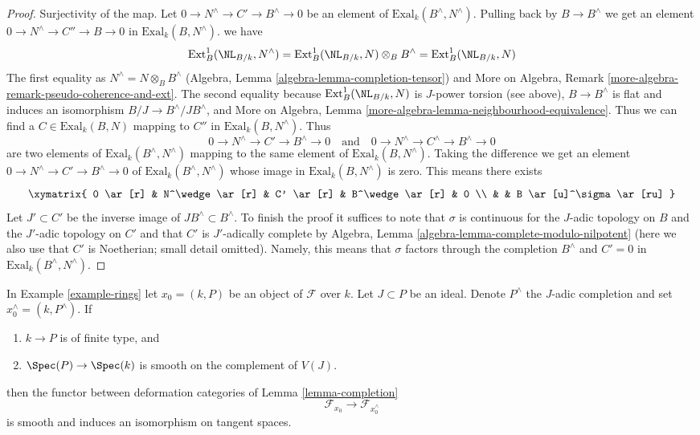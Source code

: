 \begin{proof}
\medskip\noindent
Surjectivity of the map. Let $0 \to N^\wedge \to C' \to B^\wedge \to 0$
be an element of $\text{Exal}_k(B^\wedge, N^\wedge)$.
Pulling back by $B \to B^\wedge$ we get an element
$0 \to N^\wedge \to C'' \to B \to 0$ in
$\text{Exal}_k(B, N^\wedge)$.
we have
$$
\text{Ext}^1_B(\NL_{B/k}, N^\wedge) =
\text{Ext}^1_B(\NL_{B/k}, N) \otimes_B B^\wedge =
\text{Ext}^1_B(\NL_{B/k}, N)
$$
The first equality as $N^\wedge = N \otimes_B B^\wedge$
(Algebra, Lemma \ref{algebra-lemma-completion-tensor})
and
More on Algebra, Remark \ref{more-algebra-remark-pseudo-coherence-and-ext}.
The second equality because $\text{Ext}^1_B(\NL_{B/k}, N)$
is $J$-power torsion (see above), $B \to B^\wedge$ is flat and induces
an isomorphism $B/J \to B^\wedge/JB^\wedge$, and
More on Algebra, Lemma \ref{more-algebra-lemma-neighbourhood-equivalence}.
Thus we can find a $C \in \text{Exal}_k(B, N)$ mapping to $C''$ in
$\text{Exal}_k(B, N^\wedge)$.
Thus
$$
0 \to N^\wedge \to C' \to B^\wedge \to 0
\quad\text{and}\quad
0 \to N^\wedge \to C^\wedge \to B^\wedge \to 0
$$
are two elements of $\text{Exal}_k(B^\wedge, N^\wedge)$
mapping to the same element of $\text{Exal}_k(B, N^\wedge)$.
Taking the difference we get an element
$0 \to N^\wedge \to C' \to B^\wedge \to 0$ of
$\text{Exal}_k(B^\wedge, N^\wedge)$
whose image in $\text{Exal}_k(B, N^\wedge)$ is zero.
This means there exists
$$
\xymatrix{
0 \ar[r] &
N^\wedge \ar[r] &
C' \ar[r] &
B^\wedge \ar[r] & 0 \\
& & B \ar[u]^\sigma \ar[ru]
}
$$
Let $J' \subset C'$ be the inverse image of $JB^\wedge \subset B^\wedge$.
To finish the proof it suffices to note that
$\sigma$ is continuous for the $J$-adic topology on $B$
and the $J'$-adic topology on $C'$ and that $C'$ is $J'$-adically complete by
Algebra, Lemma \ref{algebra-lemma-complete-modulo-nilpotent}
(here we also use that $C'$ is Noetherian; small detail omitted).
Namely, this means that $\sigma$ factors through the
completion $B^\wedge$ and $C' = 0$ in $\text{Exal}_k(B^\wedge, N^\wedge)$.
\end{proof}

\begin{lemma}
\label{lemma-smooth-completion}
In Example \ref{example-rings} let $x_0 = (k, P)$ be an object
of $\mathcal{F}$ over $k$. Let $J \subset P$ be an ideal.
Denote $P^\wedge$ the $J$-adic completion and set
$x_0^\wedge = (k, P^\wedge)$. If
\begin{enumerate}
\item $k \to P$ is of finite type, and
\item $\Spec(P) \to \Spec(k)$ is smooth on the complement of $V(J)$.
\end{enumerate}
then the functor between deformation categories of Lemma \ref{lemma-completion}
$$
\mathcal{F}_{x_0} \longrightarrow \mathcal{F}_{x_0^\wedge}
$$
is smooth and induces an isomorphism on tangent spaces.
\end{lemma}

